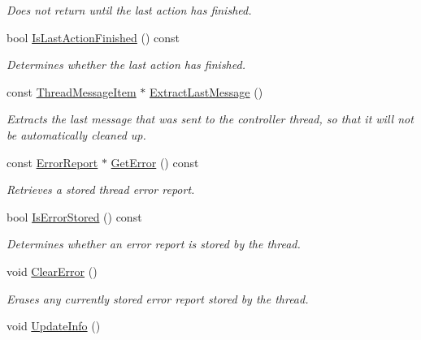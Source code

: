 \begin{DoxyCompactItemize}
\begin{DoxyCompactList}\small\item\em Does not return until the last action has finished. \item\end{DoxyCompactList}\item 
bool \hyperlink{class_upnp_nat_communication_ae74c948b4239798a1492f368a9a272bb}{IsLastActionFinished} () const 
\begin{DoxyCompactList}\small\item\em Determines whether the last action has finished. \item\end{DoxyCompactList}\item 
const \hyperlink{class_thread_message_item}{ThreadMessageItem} $\ast$ \hyperlink{class_upnp_nat_communication_ab61cad9c2a69ccab0c906f63722473b9}{ExtractLastMessage} ()
\begin{DoxyCompactList}\small\item\em Extracts the last message that was sent to the controller thread, so that it will not be automatically cleaned up. \item\end{DoxyCompactList}\item 
const \hyperlink{class_error_report}{ErrorReport} $\ast$ \hyperlink{class_upnp_nat_communication_a30a380930a99ff04facb86a2fee96732}{GetError} () const 
\begin{DoxyCompactList}\small\item\em Retrieves a stored thread error report. \item\end{DoxyCompactList}\item 
bool \hyperlink{class_upnp_nat_communication_af1866eef08649acdd47374f6716b507d}{IsErrorStored} () const 
\begin{DoxyCompactList}\small\item\em Determines whether an error report is stored by the thread. \item\end{DoxyCompactList}\item 
\hypertarget{class_upnp_nat_communication_ae6a4927667bd6fa1bc67640c2d595933}{
void \hyperlink{class_upnp_nat_communication_ae6a4927667bd6fa1bc67640c2d595933}{ClearError} ()}
\label{class_upnp_nat_communication_ae6a4927667bd6fa1bc67640c2d595933}

\begin{DoxyCompactList}\small\item\em Erases any currently stored error report stored by the thread. \item\end{DoxyCompactList}\item 
\hypertarget{class_upnp_nat_communication_a84646f88912a9f8b2333de6ad3561350}{
void \hyperlink{class_upnp_nat_communication_a84646f88912a9f8b2333de6ad3561350}{UpdateInfo} ()}
\label{class_upnp_nat_communication_a84646f88912a9f8b2333de6ad3561350}


\end{DoxyCompactItemize}
